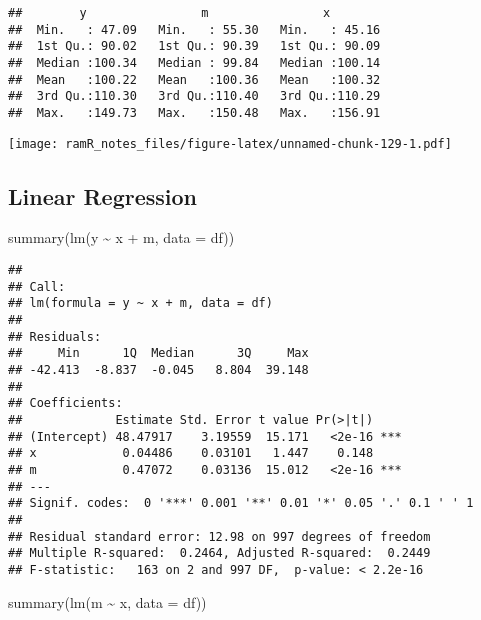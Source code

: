 \documentclass[
]{book}
\newenvironment{Shaded}{\begin{snugshade}}{\end{snugshade}}
\newcommand{\AttributeTok}[1]{\textcolor[rgb]{0.77,0.63,0.00}{#1}}
\newcommand{\FunctionTok}[1]{\textcolor[rgb]{0.00,0.00,0.00}{#1}}
\newcommand{\NormalTok}[1]{#1}
\newcommand{\SpecialCharTok}[1]{\textcolor[rgb]{0.00,0.00,0.00}{#1}}
\theoremstyle{definition}
\theoremstyle{definition}
\theoremstyle{definition}
\theoremstyle{remark}
\begin{document}
\begin{verbatim}
##        y                m                x         
##  Min.   : 47.09   Min.   : 55.30   Min.   : 45.16  
##  1st Qu.: 90.02   1st Qu.: 90.39   1st Qu.: 90.09  
##  Median :100.34   Median : 99.84   Median :100.14  
##  Mean   :100.22   Mean   :100.36   Mean   :100.32  
##  3rd Qu.:110.30   3rd Qu.:110.40   3rd Qu.:110.29  
##  Max.   :149.73   Max.   :150.48   Max.   :156.91
\end{verbatim}

\texttt{[image: ramR\_notes\_files/figure-latex/unnamed-chunk-129-1.pdf]}

\hypertarget{linear-regression-2}{%
\subsection{Linear Regression}\label{linear-regression-2}}

\begin{Shaded}
\begin{Highlighting}[]
\FunctionTok{summary}\NormalTok{(}\FunctionTok{lm}\NormalTok{(y }\SpecialCharTok{\textasciitilde{}}\NormalTok{ x }\SpecialCharTok{+}\NormalTok{ m, }\AttributeTok{data =}\NormalTok{ df))}
\end{Highlighting}
\end{Shaded}

\begin{verbatim}
## 
## Call:
## lm(formula = y ~ x + m, data = df)
## 
## Residuals:
##     Min      1Q  Median      3Q     Max 
## -42.413  -8.837  -0.045   8.804  39.148 
## 
## Coefficients:
##             Estimate Std. Error t value Pr(>|t|)    
## (Intercept) 48.47917    3.19559  15.171   <2e-16 ***
## x            0.04486    0.03101   1.447    0.148    
## m            0.47072    0.03136  15.012   <2e-16 ***
## ---
## Signif. codes:  0 '***' 0.001 '**' 0.01 '*' 0.05 '.' 0.1 ' ' 1
## 
## Residual standard error: 12.98 on 997 degrees of freedom
## Multiple R-squared:  0.2464, Adjusted R-squared:  0.2449 
## F-statistic:   163 on 2 and 997 DF,  p-value: < 2.2e-16
\end{verbatim}

\begin{Shaded}
\begin{Highlighting}[]
\FunctionTok{summary}\NormalTok{(}\FunctionTok{lm}\NormalTok{(m }\SpecialCharTok{\textasciitilde{}}\NormalTok{ x, }\AttributeTok{data =}\NormalTok{ df))}
\end{Highlighting}
\end{Shaded}
\end{document}
